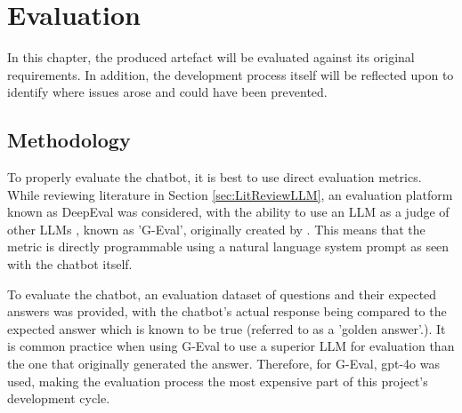 \chapter{Evaluation}\label{ch:Evaluation}
In this chapter, the produced artefact will be evaluated against its original requirements.
In addition, the development process itself will be reflected upon to identify where issues arose 
and could have been prevented.

\section{Methodology}\label{sec:DeepEval}


\para To properly evaluate the chatbot, it is best to use direct evaluation metrics. While reviewing literature in Section 
\ref{sec:LitReviewLLM}, an evaluation platform known as DeepEval was considered, with the ability to use an LLM as a judge of 
other LLMs \autocite{deepeval_introduction_2024}, known as 'G-Eval', originally created by \textcite{liuGEvalNLGEvaluation2023a}.
This means that the metric is directly programmable using a natural language system prompt as seen with the chatbot itself.

\para 
To evaluate the chatbot, an evaluation dataset of questions and their expected answers was provided, with the chatbot's actual response being
compared to the expected answer which is known to be true (referred to as a 'golden answer'.). It is common practice when using G-Eval to use a 
superior LLM for evaluation than the one that originally generated the answer. Therefore, for G-Eval, gpt-4o was used, making the evaluation process 
the most expensive part of this project's development cycle. 

